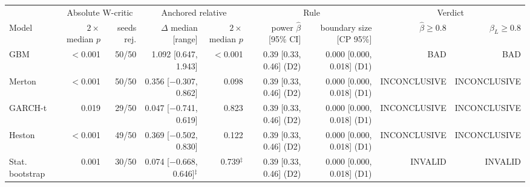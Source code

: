 \begin{tabular}{lrrrrrrrr}
\toprule
 & \multicolumn{2}{c}{Absolute W-critic} & \multicolumn{2}{c}{Anchored relative} & \multicolumn{2}{c}{Rule} & \multicolumn{2}{c}{Verdict} \\
\cmidrule(lr){2-3} \cmidrule(lr){4-5} \cmidrule(lr){6-7} \cmidrule(lr){8-9}
Model & $2\times$median $p$ & seeds rej. & $\Delta$ median [range] & $2\times$median $p$ & power $\hat\beta$ [95\% CI] & boundary size [CP 95\%] & $\hat\beta\ge0.8$ & $\beta_L\ge0.8$ \\
\midrule
GBM & $<$0.001 & 50/50 & 1.092 [0.647, 1.943] & $<$0.001 & 0.39 [0.33, 0.46] (D2) & 0.000 [0.000, 0.018] (D1) & BAD & BAD \\
Merton & $<$0.001 & 50/50 & 0.356 [$-$0.307, 0.862] & 0.098 & 0.39 [0.33, 0.46] (D2) & 0.000 [0.000, 0.018] (D1) & INCONCLUSIVE & INCONCLUSIVE \\
GARCH-t & 0.019 & 29/50 & 0.047 [$-$0.741, 0.619] & 0.823 & 0.39 [0.33, 0.46] (D2) & 0.000 [0.000, 0.018] (D1) & INCONCLUSIVE & INCONCLUSIVE \\
Heston & $<$0.001 & 49/50 & 0.369 [$-$0.502, 0.830] & 0.122 & 0.39 [0.33, 0.46] (D2) & 0.000 [0.000, 0.018] (D1) & INCONCLUSIVE & INCONCLUSIVE \\
Stat. bootstrap & 0.001 & 30/50 & 0.074 [$-$0.668, 0.646]$^{\ddagger}$ & 0.739$^{\ddagger}$ & 0.39 [0.33, 0.46] (D2) & 0.000 [0.000, 0.018] (D1) & INVALID & INVALID \\
\bottomrule
\end{tabular}
